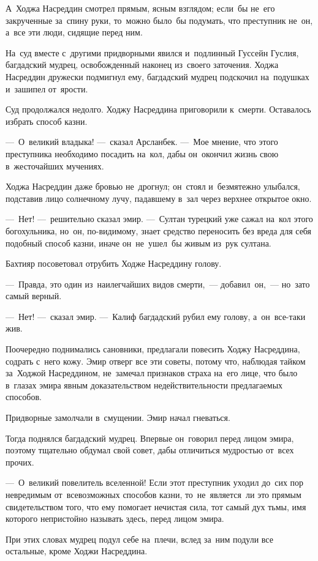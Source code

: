 \documentclass[12pt,a4paper]{book}
\begin{document}
А~Ходжа Насреддин смотрел прямым, ясным взглядом; если~бы не~его закрученные за~спину руки, то~можно было~бы подумать, что преступник не~он, а~все эти люди, сидящие перед ним.

На~суд вместе с~другими придворными явился и~подлинный Гуссейн Гуслия, багдадский мудрец, освобожденный наконец из~своего заточения. Ходжа Насреддин дружески подмигнул ему, багдадский мудрец подскочил на~подушках и~зашипел от~ярости.

Суд продолжался недолго. Ходжу Насреддина приговорили к~смерти. Оставалось избрать способ казни.

—~О~великий владыка! —~сказал Арсланбек. —~Мое мнение, что этого преступника необходимо посадить на~кол, дабы он~окончил жизнь свою в~жесточайших мучениях.

Ходжа Насреддин даже бровью не~дрогнул; он~стоял и~безмятежно улыбался, подставив лицо солнечному лучу, падавшему в~зал через верхнее открытое окно.

—~Нет! —~решительно сказал эмир. —~Султан турецкий уже сажал на~кол этого богохульника, но~он, по-видимому, знает средство переносить без вреда для себя подобный способ казни, иначе он~не~ушел~бы живым из~рук султана.

Бахтияр посоветовал отрубить Ходже Насреддину голову.

—~Правда, это один из~наилегчайших видов смерти,~— добавил~он,~— но~зато самый верный.

—~Нет! —~сказал эмир. —~Калиф багдадский рубил ему голову, а~он~все-таки жив.

Поочередно поднимались сановники, предлагали повесить Ходжу Насреддина, содрать с~него кожу. Эмир отверг все эти советы, потому что, наблюдая тайком за~Ходжой Насреддином, не~замечал признаков страха на~его лице, что было в~глазах эмира явным доказательством недействительности предлагаемых способов.

Придворные замолчали в~смущении. Эмир начал гневаться.

Тогда поднялся багдадский мудрец. Впервые он~говорил перед лицом эмира, поэтому тщательно обдумал свой совет, дабы отличиться мудростью от~всех прочих.

—~О~великий повелитель вселенной! Если этот преступник уходил до~сих пор невредимым от~всевозможных способов казни, то~не~является~ли это прямым свидетельством того, что ему помогает нечистая сила, тот самый дух тьмы, имя которого непристойно называть здесь, перед лицом эмира.

При этих словах мудрец подул себе на~плечи, вслед за~ним подули все остальные, кроме Ходжи Насреддина.
\end{document}
